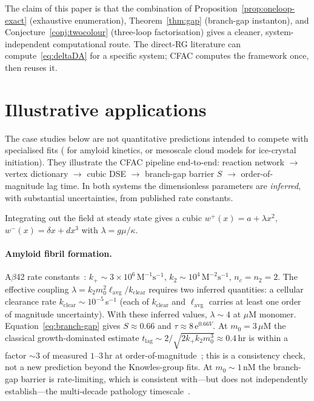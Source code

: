 \documentclass[11pt,a4paper]{article}
\newcommand{\ee}{\mathrm{e}}
\theoremstyle{plain}
\begin{document}
The claim of this paper is that the combination of
Proposition~\ref{prop:oneloop-exact} (exhaustive enumeration),
Theorem~\ref{thm:gap} (branch-gap instanton), and
Conjecture~\ref{conj:twocolour} (three-loop factorisation) gives
a cleaner, system-independent computational route.  The
direct-RG literature can compute~\eqref{eq:deltaDA} for a
specific system; CFAC computes the framework once, then reuses it.

\section{Illustrative applications}
\label{sec:applications}

The case studies below are not quantitative predictions intended
to compete with specialised fits (\cite{Meisl2014} for amyloid
kinetics, or mesoscale cloud models for ice-crystal initiation).
They illustrate the CFAC pipeline end-to-end: reaction network
$\to$ vertex dictionary $\to$ cubic DSE $\to$ branch-gap barrier
$S$ $\to$ order-of-magnitude lag time.  In both systems the
dimensionless parameters are \emph{inferred}, with substantial
uncertainties, from published rate constants.

Integrating out the field at steady state gives a cubic
$w^+(x) = a + \lambda x^2$, $w^-(x) = \delta x + dx^3$ with
$\lambda = g\mu/\kappa$.

\paragraph{Amyloid fibril formation.}
A$\beta$42 rate constants~\citep{Cohen2013,Meisl2014}:
$k_+ \sim 3{\times}10^6\,\text{M}^{-1}\text{s}^{-1}$,
$k_2 \sim 10^4\,\text{M}^{-2}\text{s}^{-1}$, $n_c = n_2 = 2$.
The effective coupling $\lambda = k_2 m_0^2
\ell_{\mathrm{avg}}/k_{\mathrm{clear}}$ requires two inferred
quantities: a cellular clearance rate $k_{\mathrm{clear}} \sim
10^{-5}$\,s$^{-1}$ (each of $k_{\mathrm{clear}}$ and
$\ell_{\mathrm{avg}}$ carries at least one order of magnitude
uncertainty).  With these inferred values, $\lambda \sim 4$ at
$\mu$M monomer.  Equation~\eqref{eq:branch-gap} gives
$S \approx 0.66$ and $\tau \approx 8\,\ee^{0.66 V}$.  At $m_0 = 3\,\mu$M
the classical growth-dominated estimate
$t_{\mathrm{lag}} \sim 2/\sqrt{2 k_+ k_2 m_0^3} \approx 0.4$\,hr
is within a factor $\sim 3$ of measured $1$--$3$\,hr at
order-of-magnitude~\citep{Meisl2014}; this is a consistency
check, not a new prediction beyond the Knowles-group fits.  At
$m_0 \sim 1$\,nM the branch-gap barrier is rate-limiting, which
is consistent with---but does not independently establish---the
multi-decade pathology timescale~\citep{Knowles2009}.
\end{document}
